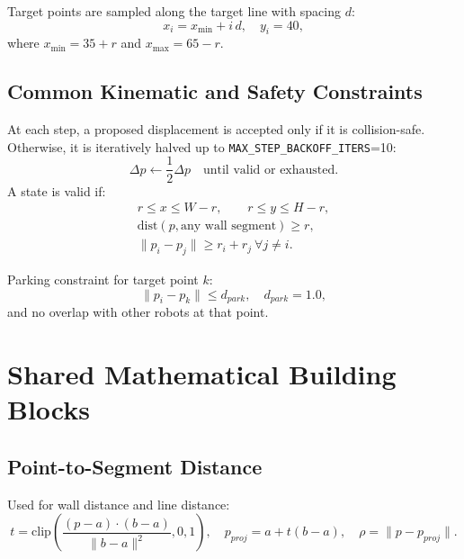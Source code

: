 \documentclass[11pt,a4paper]{article}
\begin{document}
Target points are sampled along the target line with spacing $d$:
\begin{equation}
    x_i = x_{\min} + i\,d, \quad y_i = 40,
\end{equation}
where $x_{\min}=35+r$ and $x_{\max}=65-r$.

\subsection{Common Kinematic and Safety Constraints}
At each step, a proposed displacement is accepted only if it is collision-safe. Otherwise, it is iteratively halved up to \texttt{MAX\_STEP\_BACKOFF\_ITERS}=10:
\begin{equation}
    \Delta p \leftarrow \frac{1}{2}\Delta p \quad \text{until valid or exhausted.}
\end{equation}
A state is valid if:
\begin{align}
    r \le x \le W-r, \qquad r \le y \le H-r, \\
    \text{dist}(p, \text{any wall segment}) \ge r, \\
    \|p_i-p_j\| \ge r_i+r_j \ \forall j\neq i.
\end{align}

Parking constraint for target point $k$:
\begin{equation}
    \|p_i - p_k\| \le d_{park}, \quad d_{park}=1.0,
\end{equation}
and no overlap with other robots at that point.

\section{Shared Mathematical Building Blocks}

\subsection{Point-to-Segment Distance}
Used for wall distance and line distance:
\begin{equation}
    t=\mathrm{clip}\left(\frac{(p-a)\cdot(b-a)}{\|b-a\|^2},0,1\right),\quad p_{proj}=a+t(b-a),\quad \rho=\|p-p_{proj}\|.
\end{equation}
\end{document}
